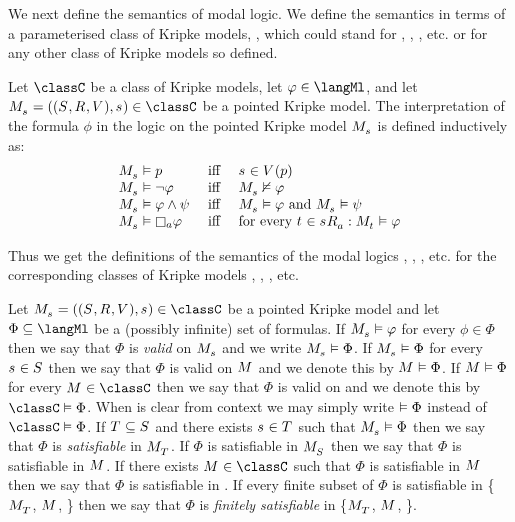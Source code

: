 We next define the semantics of modal logic.
We define the semantics in terms of a parameterised class of Kripke models, \classC{}, which could stand for \classK{}, \classKF{}, \classKFF{}, etc. or for any other class of Kripke models so defined.

\begin{definition}\label{modal-semantics}
Let $\classC$ be a class of Kripke models, let $\phi \in \langMl$, and let $\pointedModelAndTuple{\stateS} \in \classC$ be a pointed Kripke model.
The interpretation of the formula $\phi$ in the logic \logicC{} on the pointed Kripke model $\pointedModel{\stateS}$ is defined inductively as:
$$
\begin{array}{lcl}
\pointedModel{\stateS} \entails \atomP & \text{ iff } & \stateS \in \valuation(\atomP)\\
\pointedModel{\stateS} \entails \lnot \phi & \text{ iff } & \pointedModel{\stateS} \nentails \phi\\
\pointedModel{\stateS} \entails \phi \land \psi & \text{ iff } & \pointedModel{\stateS} \entails \phi \text{ and } \pointedModel{\stateS} \entails \psi\\
\pointedModel{\stateS} \entails \necessary[\agentA] \phi & \text{ iff } & \text{for every } \stateT \in \successors{\agentA}{\stateS} : \pointedModel{\stateT} \entails \phi
\end{array}
$$
\end{definition}

Thus we get the definitions of the semantics of the modal logics \logicK{}, \logicKF{}, \logicKFF{}, etc. for the corresponding classes of Kripke models \classK{}, \classKF{}, \classKFF{}, etc.

Let $\pointedModelAndTuple{\stateS} \in \classC$ be a pointed Kripke model and
let $\Phi \subseteq \langMl$ be a (possibly infinite) set of formulas.
If $\pointedModel{\stateS} \entails \phi$ for every $\phi \in \Phi$ then we say that $\Phi$ is {\em valid} on $\pointedModel{\stateS}$ and we write $\pointedModel{\stateS} \entails \Phi$.
If $\pointedModel{\stateS} \entails \Phi$ for every $\stateS \in \states$ then we say that $\Phi$ is valid on $\model$ and we denote this by $\model \entails \Phi$.
If $\model \entails \Phi$ for every $\model \in \classC$ then we say that $\Phi$ is valid on \classC{} and we denote this by $\classC \entails \Phi$.
When \classC{} is clear from context we may simply write $\vDash \Phi$ instead of $\classC \entails \Phi$.
If $\statesT \subseteq \states$ and there exists $\stateS \in \statesT$ such that $\pointedModel{\stateS} \entails \Phi$ then we say that $\Phi$ is {\em satisfiable} in $\pointedModel{\statesT}$.
If $\Phi$ is satisfiable in $\pointedModel{\states}$ then we say that $\Phi$ is satisfiable in $\model$.
If there exists $\model \in \classC$ such that $\Phi$ is satisfiable in $\model$ then we say that $\Phi$ is satisfiable in \classC{}.
If every finite subset of $\Phi$ is satisfiable in \{$\pointedModel{\statesT}$, $\model$, \classC{}\} then we say that $\Phi$ is {\em finitely satisfiable} in \{$\pointedModel{\statesT}$, $\model$, \classC{}\}.

